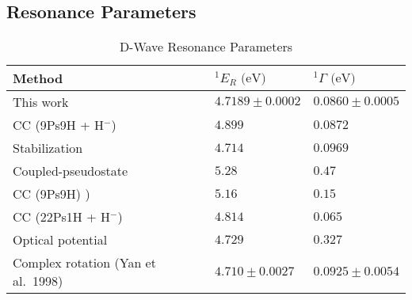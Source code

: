 \documentclass[Dissertation.tex]{subfiles}
\begin{document}
\subsection{Resonance Parameters}

\setlength{\abovecaptionskip}{6pt}   %
\setlength{\belowcaptionskip}{6pt}   %
\begin{table}[H]
\centering
\begin{tabular}{l l l}
\toprule
Method & $^1E_R \text{ (eV)}$ & $^1\Gamma \text{ (eV)}$ \\
\midrule
This work & $4.7189 \pm 0.0002$ & $0.0860 \pm 0.0005$ \\
CC (9Ps9H + H$^-$) \cite{Walters2004} & $4.899$ & $0.0872$ \\
Stabilization \cite{Yan2003} & $4.714$ & $0.0969$ \\
Coupled-pseudostate \cite{Campbell1998} & $5.28$ & $0.47$ \\
CC (9Ps9H) \cite{Blackwood2002}) & $5.16$ & $0.15$ \\
CC (22Ps1H + H$^-$) \cite{Blackwood2002b} & $4.814$ & $0.065$ \\
Optical potential \cite{DiRienzi2002a} & $4.729$ & $0.327$ \\
Complex rotation (Yan et al.\ 1998) \cite{Ho1998} & $4.710 \pm 0.0027$ & $0.0925 \pm 0.0054$  \\
\bottomrule
\end{tabular}
\caption{D-Wave Resonance Parameters} %
\label{tab:DWaveResonancesOther}
\end{table}
\end{document}
